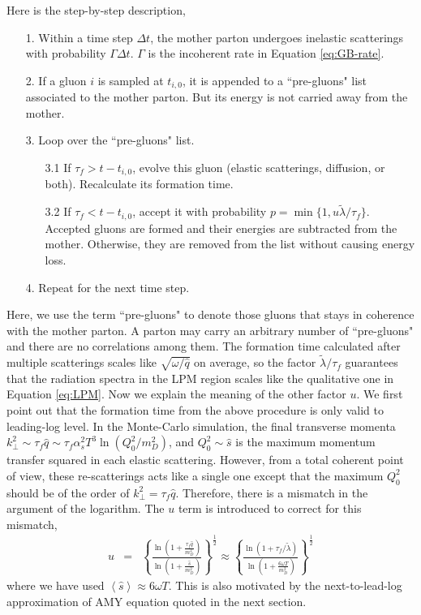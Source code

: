 \documentclass[aps, prc, reprint, amsmath, groupedaddress, nofootinbib]{revtex4-1}
\begin{document}
Here is the step-by-step description,
\begin{itemize}
\item[1.] Within a time step $\Delta t$, the mother parton undergoes inelastic scatterings with probability $\Gamma\Delta t$. $\Gamma$ is the incoherent rate in Equation \ref{eq:GB-rate}.
\item[2.] If a gluon $i$ is sampled at $t_{i,0}$, it is appended to a ``pre-gluons" list associated to the mother parton. But its energy is not carried away from the mother.
\item[3.] Loop over the ``pre-gluons" list. 
\begin{itemize}
\item[3.1] If $\tau_f > t-t_{i,0}$, evolve this gluon (elastic scatterings, diffusion, or both). Recalculate its formation time.
\item[3.2] If $\tau_f < t-t_{i,0}$, accept it with probability $p = \min\{1, u\tilde{\lambda}/\tau_f\}$. Accepted gluons are formed and their energies are subtracted from the mother. Otherwise, they are removed from the list without causing energy loss.
\end{itemize} 
\item[4.] Repeat for the next time step.
\end{itemize}
Here, we use the term ``pre-gluons" to denote those gluons that stays in coherence with the mother parton.
A parton may carry an arbitrary number of ``pre-gluons" and there are no correlations among them.
The formation time calculated after multiple scatterings scales like $\sqrt{\omega/\hat{q}}$ on average, so the factor $\tilde{\lambda}/\tau_f$ guarantees that the radiation spectra in the LPM region scales like the qualitative one in Equation \ref{eq:LPM}.
Now we explain the meaning of the other factor $u$.
We first point out that the formation time from the above procedure is only valid to leading-log level.
In the Monte-Carlo simulation, the final transverse momenta $k_\perp^2\sim \tau_f \hat{q} \sim \tau_f \alpha_s^2 T^3 \ln(Q_0^2/m_D^2)$, 
and $Q_0^2\sim \hat{s}$ is the maximum momentum transfer squared in each elastic scattering.
However, from a total coherent point of view, these re-scatterings acts like a single one except that the maximum $Q_0^2$ should be of the order of $k_\perp^2 = \tau_f \hat{q}$.
Therefore, there is a mismatch in the argument of the logarithm.
The $u$ term is introduced to correct for this mismatch,
\begin{eqnarray}
u &=& \left\{\frac{\ln\left(1+\frac{\tau_f\hat{q}}{m_D^2}\right)}{\ln\left(1+\frac{\hat{s}}{m_D^2}\right)}\right\}^{\frac{1}{2}}
\approx \left\{\frac{\ln\left(1+\tau_f/\tilde{\lambda}\right)}{\ln\left(1+\frac{6\omega T}{m_D^2}\right)}\right\}^{\frac{1}{2}}
\end{eqnarray} 
where we have used $\left\langle\hat{s}\right\rangle \approx 6 \omega T$.
This is also motivated by the next-to-lead-log approximation of AMY equation quoted in the next section.
\end{document}
